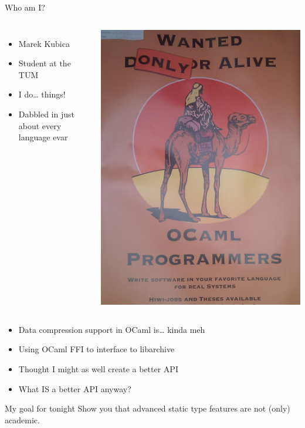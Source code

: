 \documentclass{beamer}
\begin{document}
\begin{frame}{Who am I?}
  \begin{columns}
      \begin{itemize}
        \item Marek Kubica
        \item Student at the TUM
        \item I do… things!
        \item Dabbled in just about every language evar
      \end{itemize}
      \includegraphics[height=0.9\textheight]{poster}
  \end{columns}
\end{frame}

\begin{frame}
  \begin{itemize}
    \item Data compression support in OCaml is… kinda meh
    \item Using OCaml FFI to interface to libarchive
    \item Thought I might as well create a better API
    \item What IS a better API anyway?
  \end{itemize}
  \pause
  \begin{exampleblock}{My goal for tonight}
    Show you that advanced static type features are not (only) academic.
  \end{exampleblock}
\end{frame}
\end{document}
